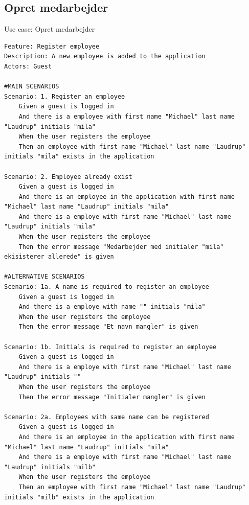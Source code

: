 \subsection{Opret medarbejder}
\begin{listing}[H]
    \centering
    \caption{Use case: Opret medarbejder}\label{lst:usecase_register_employee}
    \begin{verbatim}  
Feature: Register employee
Description: A new employee is added to the application
Actors: Guest

#MAIN SCENARIOS
Scenario: 1. Register an employee
    Given a guest is logged in
    And there is a employee with first name "Michael" last name "Laudrup" initials "mila"  
    When the user registers the employee
    Then an employee with first name "Michael" last name "Laudrup" initials "mila" exists in the application

Scenario: 2. Employee already exist
    Given a guest is logged in
    And there is an employee in the application with first name "Michael" last name "Laudrup" initials "mila"
    And there is a employe with first name "Michael" last name "Laudrup" initials "mila"  
    When the user registers the employee
    Then the error message "Medarbejder med initialer "mila" ekisisterer allerede" is given

#ALTERNATIVE SCENARIOS
Scenario: 1a. A name is required to register an employee
    Given a guest is logged in
    And there is a employe with name "" initials "mila"  
    When the user registers the employee
    Then the error message "Et navn mangler" is given

Scenario: 1b. Initials is required to register an employee
    Given a guest is logged in
    And there is a employe with first name "Michael" last name "Laudrup" initials ""
    When the user registers the employee
    Then the error message "Initialer mangler" is given

Scenario: 2a. Employees with same name can be registered
    Given a guest is logged in
    And there is an employee in the application with first name "Michael" last name "Laudrup" initials "mila"
    And there is a employe with first name "Michael" last name "Laudrup" initials "milb"  
    When the user registers the employee
    Then an employee with first name "Michael" last name "Laudrup" initials "milb" exists in the application

    \end{verbatim}
\end{listing}

